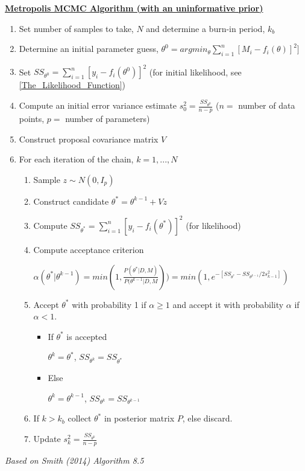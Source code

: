\begin{tcolorbox} \label{alg:met}
\textbf{\underline{Metropolis MCMC Algorithm (with an uninformative prior)}} 
\begin{enumerate}
    \item Set number of samples to take, $N$ and determine a burn-in period, $k_b$
    \item \label{step:2met} Determine an initial parameter guess, $\theta^0 = argmin_\theta \sum_{i=1}^{n}[M_i - f_i(\theta)]^2]$

    \item Set $SS_{\theta^0} = \sum_{i = 1}^{n}[y_i - f_i(\theta^0)]^2$ (for initial likelihood, see \ref{The_Likelihood_Function})
    \item Compute an initial error variance estimate $s_0^2 = \frac{SS_{\theta^0}}{n-p}$ ($n = $ number of data points, $p = $ number of parameters)
    \item Construct proposal covariance matrix $V$
    \item \label{step:6met}For each iteration of the chain, $k = 1,...,N$ 
    \begin{enumerate}
        \item Sample $z \sim N(0,I_p)$ 
        \item Construct candidate $\theta^* = \theta^{k-1}+ Vz$
        \item Compute $SS_{\theta^*} = \sum_{i = 1}^{n}[y_i - f_i(\theta^*)]^2$ (for likelihood)
        \item Compute acceptance criterion
            \begin{center}
                $\alpha(\theta^* | \theta^{k-1}) = min(1, \frac{P(\theta^* |D, M)}{P(\theta^{k-1}|D, M})) = min(1, e^{-[SS_{\theta^*}-SS_{\theta^{k-1}}/2s_{k-1}^2]})$
            \end{center}
        \item Accept $\theta^*$ with probability 1 if $\alpha \geq 1$ and accept it with probability $\alpha$ if $\alpha < 1$.
        \begin{itemize}
            \item If $\theta^*$ is accepted
            \begin{center}
                $\theta^k = \theta^*$, $SS_{\theta^k} = SS_{\theta^*}$
            \end{center}
            \item Else
            \begin{center}
                $\theta^k = \theta^{k-1}$, $SS_{\theta^k} = SS_{\theta^{k-1}}$
            \end{center}
        \end{itemize}
        \item If $k > k_b$ collect $\theta^*$ in posterior matrix $P$, else discard.
        \item Update $s_k^2 = \frac{SS_{\theta^k}}{n-p}$
    \end{enumerate}
\end{enumerate}
\emph{Based on Smith (2014) Algorithm 8.5}
\end{tcolorbox}
